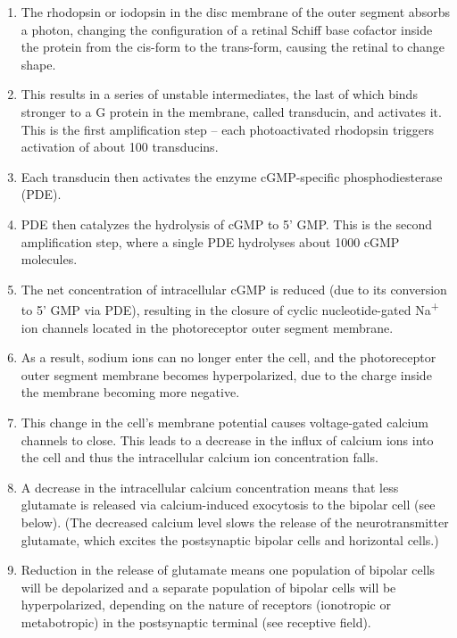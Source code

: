 \documentclass[]{book}
\providecommand{\tightlist}{%
  \setlength{\itemsep}{0pt}\setlength{\parskip}{0pt}}
\begin{document}
\begin{enumerate}
\def\labelenumi{\arabic{enumi}.}
\tightlist
\item
  The rhodopsin or iodopsin in the disc membrane of the outer segment absorbs a photon, changing the configuration of a retinal Schiff base cofactor inside the protein from the cis-form to the trans-form, causing the retinal to change shape.
\item
  This results in a series of unstable intermediates, the last of which binds stronger to a G protein in the membrane, called transducin, and activates it. This is the first amplification step -- each photoactivated rhodopsin triggers activation of about 100 transducins.
\item
  Each transducin then activates the enzyme cGMP-specific phosphodiesterase (PDE).
\item
  PDE then catalyzes the hydrolysis of cGMP to 5' GMP. This is the second amplification step, where a single PDE hydrolyses about 1000 cGMP molecules.
\item
  The net concentration of intracellular cGMP is reduced (due to its conversion to 5' GMP via PDE), resulting in the closure of cyclic nucleotide-gated Na\textsuperscript{+} ion channels located in the photoreceptor outer segment membrane.
\item
  As a result, sodium ions can no longer enter the cell, and the photoreceptor outer segment membrane becomes hyperpolarized, due to the charge inside the membrane becoming more negative.
\item
  This change in the cell's membrane potential causes voltage-gated calcium channels to close. This leads to a decrease in the influx of calcium ions into the cell and thus the intracellular calcium ion concentration falls.
\item
  A decrease in the intracellular calcium concentration means that less glutamate is released via calcium-induced exocytosis to the bipolar cell (see below). (The decreased calcium level slows the release of the neurotransmitter glutamate, which excites the postsynaptic bipolar cells and horizontal cells.)
\item
  Reduction in the release of glutamate means one population of bipolar cells will be depolarized and a separate population of bipolar cells will be hyperpolarized, depending on the nature of receptors (ionotropic or metabotropic) in the postsynaptic terminal (see receptive field).
\end{enumerate}
\end{document}
